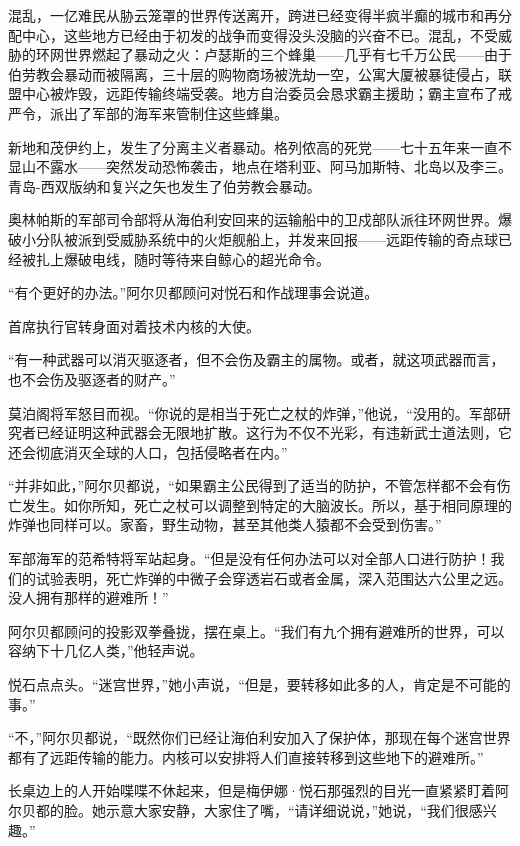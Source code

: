 \documentclass[AutoFakeBold=true]{book}
\begin{document}
混乱，一亿难民从胁云笼罩的世界传送离开，跨进已经变得半疯半癫的城市和再分配中心，这些地方已经由于初发的战争而变得没头没脑的兴奋不已。混乱，不受威胁的环网世界燃起了暴动之火：卢瑟斯的三个蜂巢——几乎有七千万公民——由于伯劳教会暴动而被隔离，三十层的购物商场被洗劫一空，公寓大厦被暴徒侵占，联盟中心被炸毁，远距传输终端受袭。地方自治委员会恳求霸主援助；霸主宣布了戒严令，派出了军部的海军来管制住这些蜂巢。

新地和茂伊约上，发生了分离主义者暴动。格列侬高的死党——七十五年来一直不显山不露水——突然发动恐怖袭击，地点在塔利亚、阿马加斯特、北岛以及李三。青岛-西双版纳和复兴之矢也发生了伯劳教会暴动。

奥林帕斯的军部司令部将从海伯利安回来的运输船中的卫戍部队派往环网世界。爆破小分队被派到受威胁系统中的火炬舰船上，并发来回报——远距传输的奇点球已经被扎上爆破电线，随时等待来自鲸心的超光命令。

\vspace*{1em}

``有个更好的办法。''阿尔贝都顾问对悦石和作战理事会说道。

首席执行官转身面对着技术内核的大使。

``有一种武器可以消灭驱逐者，但不会伤及霸主的属物。或者，就这项武器而言，也不会伤及驱逐者的财产。''

莫泊阁将军怒目而视。``你说的是相当于死亡之杖的炸弹，''他说，``没用的。军部研究者已经证明这种武器会无限地扩散。这行为不仅不光彩，有违新武士道法则，它还会彻底消灭全球的人口，包括侵略者在内。''

``并非如此，''阿尔贝都说，``如果霸主公民得到了适当的防护，不管怎样都不会有伤亡发生。如你所知，死亡之杖可以调整到特定的大脑波长。所以，基于相同原理的炸弹也同样可以。家畜，野生动物，甚至其他类人猿都不会受到伤害。''

军部海军的范希特将军站起身。``但是没有任何办法可以对全部人口进行防护！我们的试验表明，死亡炸弹的中微子会穿透岩石或者金属，深入范围达六公里之远。没人拥有那样的避难所！''

阿尔贝都顾问的投影双拳叠拢，摆在桌上。``我们有九个拥有避难所的世界，可以容纳下十几亿人类，''他轻声说。

悦石点点头。``迷宫世界，''她小声说，``但是，要转移如此多的人，肯定是不可能的事。''

``不，''阿尔贝都说，``既然你们已经让海伯利安加入了保护体，那现在每个迷宫世界都有了远距传输的能力。内核可以安排将人们直接转移到这些地下的避难所。''

长桌边上的人开始喋喋不休起来，但是梅伊娜·悦石那强烈的目光一直紧紧盯着阿尔贝都的脸。她示意大家安静，大家住了嘴，``请详细说说，''她说，``我们很感兴趣。''
\end{document}
